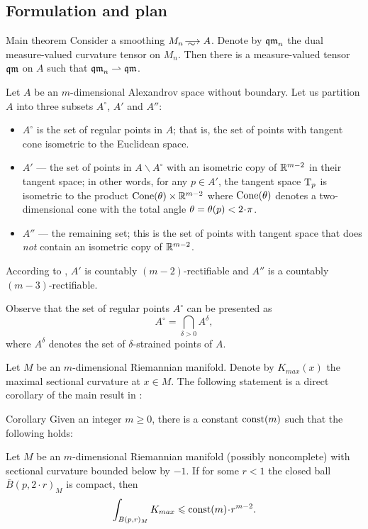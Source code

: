 \subsection{Formulation and plan}
  
\begin{thm}{Main theorem}\label{main}
Consider a smoothing $M_n\smooths{} A$.
Denote by $\operatorname{\mathfrak{qm}}_n$ the dual measure-valued curvature tensor on $M_n$.
Then there is a measure-valued tensor $\operatorname{\mathfrak{qm}}$ on $A$ such that $\operatorname{\mathfrak{qm}}_n\rightharpoonup \operatorname{\mathfrak{qm}}$.
\end{thm}

Let $A$ be an $m$-dimensional Alexandrov space without boundary. 
Let us partition $A$ into three subsets $A^\circ$, $A'$ and $A''$:
\begin{itemize}
\item $A^\circ$ is the set of regular points in $A$; that is, the set of points with tangent cone isometric to the Euclidean space.
\item $A'$ --- the set of points in $A\backslash A^\circ$ with an isometric copy of $\mathbb{R}^{m-2}$ in their tangent space;
in other words, for any $p\in A'$, the tangent space $\mathrm{T}_p$ is isometric to the product $\operatorname{Cone}(\theta)\times\mathbb{R}^{m-2}$ where $\operatorname{Cone}(\theta)$ denotes a two-dimensional cone with the total angle $\theta\zz=\theta(p)<2\cdot \pi$.
\item $A''$ --- the remaining set; this is the set of points with tangent space that does \emph{not} contain an isometric copy of $\mathbb{R}^{m-2}$.
\end{itemize}
According to \cite{li-naber}, $A'$ is countably $(m-2)$-rectifiable and $A''$ is a countably $(m-3)$-rectifiable. 

Observe that the set of regular points $A^\circ$ can be presented as
$$A^{\circ}=\bigcap_{\delta>0} A^\delta,$$
where $A^\delta$ denotes the set of $\delta$-strained points of $A$.

Let $M$ be an $m$-dimensional Riemannian manifold.
Denote by $K_{max}(x)$ the maximal sectional curvature at $x\in M$.
The following statement is a direct corollary of the main result in \cite{petrunin-SC}:

\begin{thm}{Corollary}\label{cor:Kmax}
Given an integer $m\ge 0$, there is a constant $\mathrm{const}(m)$ such that the following holds:

Let $M$ be an $m$-dimensional Riemannian manifold 
(possibly noncomplete)
with sectional curvature bounded below by $-1$.
If for some $r<1$ the closed ball $\bar B(p,2\cdot r)_M$ is compact,
then 
$$\int_{B(p,r)_M} K_{max}\le \const(m)\cdot r^{m-2}.$$

\end{thm}

